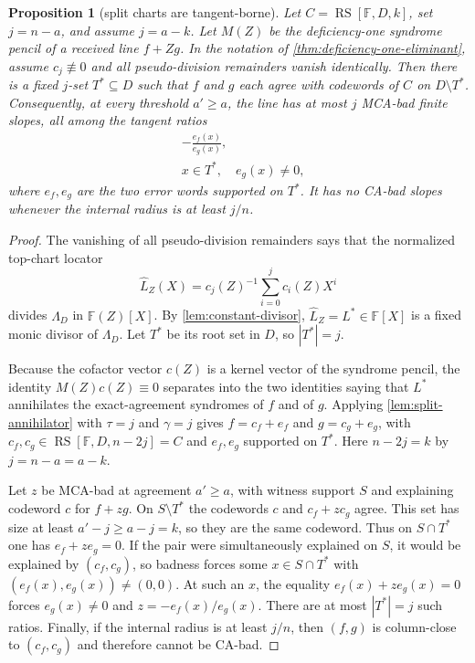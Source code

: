 \documentclass[a4paper,11pt]{amsart}
\newtheorem{proposition}[theorem]{Proposition}
\theoremstyle{remark}
\newcommand{\F}{\mathbb F}
\newcommand{\RS}{\operatorname{RS}}
\begin{document}
\begin{proposition}[split charts are tangent-borne]\label{prop:split-chart-tangent}
Let \(C=\RS[\F,D,k]\), set \(j=n-a\), and assume \(j=a-k\).  Let \(M(Z)\) be the deficiency-one syndrome pencil of a received line \(f+Zg\).  In the notation of \cref{thm:deficiency-one-eliminant}, assume \(c_j\not\equiv0\) and all pseudo-division remainders vanish identically.  Then there is a fixed \(j\)-set \(T^*\subseteq D\) such that \(f\) and \(g\) each agree with codewords of \(C\) on \(D\setminus T^*\).  Consequently, at every threshold \(a'\ge a\), the line has at most \(j\) MCA-bad finite slopes, all among the tangent ratios
\[
        \begin{aligned}
        &-\frac{e_f(x)}{e_g(x)},\\
        &x\in T^*,\quad e_g(x)\ne0,
        \end{aligned}
\]
where \(e_f,e_g\) are the two error words supported on \(T^*\).  It has no CA-bad slopes whenever the internal radius is at least \(j/n\).
\end{proposition}

\begin{proof}
The vanishing of all pseudo-division remainders says that the normalized top-chart locator
\[
        \widehat L_Z(X)=c_j(Z)^{-1}\sum_{i=0}^j c_i(Z)X^i
\]
divides \(\Lambda_D\) in \(\F(Z)[X]\).  By \cref{lem:constant-divisor}, \(\widehat L_Z=L^*\in\F[X]\) is a fixed monic divisor of \(\Lambda_D\).  Let \(T^*\) be its root set in \(D\), so \(|T^*|=j\).

Because the cofactor vector \(c(Z)\) is a kernel vector of the syndrome pencil, the identity \(M(Z)c(Z)\equiv0\) separates into the two identities saying that \(L^*\) annihilates the exact-agreement syndromes of \(f\) and of \(g\).  Applying \cref{lem:split-annihilator} with \(\tau=j\) and \(\gamma=j\) gives \(f=c_f+e_f\) and \(g=c_g+e_g\), with \(c_f,c_g\in\RS[\F,D,n-2j]=C\) and \(e_f,e_g\) supported on \(T^*\).  Here \(n-2j=k\) by \(j=n-a=a-k\).

Let \(z\) be MCA-bad at agreement \(a'\ge a\), with witness support \(S\) and explaining codeword \(c\) for \(f+zg\).  On \(S\setminus T^*\) the codewords \(c\) and \(c_f+zc_g\) agree.  This set has size at least \(a'-j\ge a-j=k\), so they are the same codeword.  Thus on \(S\cap T^*\) one has \(e_f+ze_g=0\).  If the pair were simultaneously explained on \(S\), it would be explained by \((c_f,c_g)\), so badness forces some \(x\in S\cap T^*\) with \((e_f(x),e_g(x))\ne(0,0)\).  At such an \(x\), the equality \(e_f(x)+ze_g(x)=0\) forces \(e_g(x)\ne0\) and \(z=-e_f(x)/e_g(x)\).  There are at most \(|T^*|=j\) such ratios.  Finally, if the internal radius is at least \(j/n\), then \((f,g)\) is column-close to \((c_f,c_g)\) and therefore cannot be CA-bad.
\end{proof}
\end{document}
